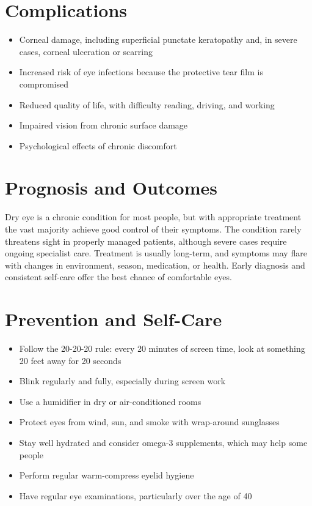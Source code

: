\section*{Complications}
\begin{itemize}
    \item Corneal damage, including superficial punctate keratopathy and, in severe cases, corneal ulceration or scarring
    \item Increased risk of eye infections because the protective tear film is compromised
    \item Reduced quality of life, with difficulty reading, driving, and working
    \item Impaired vision from chronic surface damage
    \item Psychological effects of chronic discomfort
\end{itemize}

\section*{Prognosis and Outcomes}
Dry eye is a chronic condition for most people, but with appropriate treatment the vast majority achieve good control of their symptoms. The condition rarely threatens sight in properly managed patients, although severe cases require ongoing specialist care. Treatment is usually long-term, and symptoms may flare with changes in environment, season, medication, or health. Early diagnosis and consistent self-care offer the best chance of comfortable eyes.

\section*{Prevention and Self-Care}
\begin{itemize}
    \item Follow the 20-20-20 rule: every 20 minutes of screen time, look at something 20 feet away for 20 seconds
    \item Blink regularly and fully, especially during screen work
    \item Use a humidifier in dry or air-conditioned rooms
    \item Protect eyes from wind, sun, and smoke with wrap-around sunglasses
    \item Stay well hydrated and consider omega-3 supplements, which may help some people
    \item Perform regular warm-compress eyelid hygiene
    \item Have regular eye examinations, particularly over the age of 40
\end{itemize}

